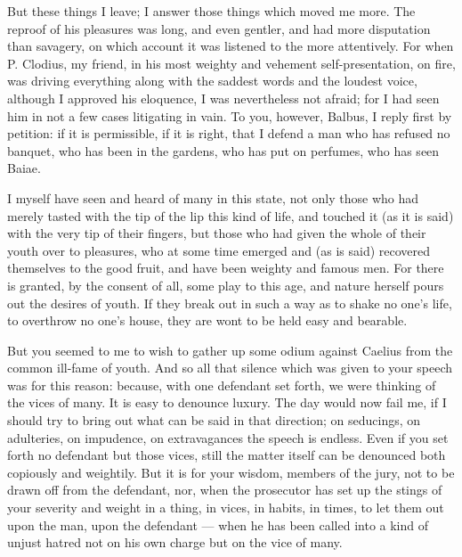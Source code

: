  But these things I leave; I answer those things which moved me more. The reproof of his pleasures was long, and even gentler, and had more disputation than savagery, on which account it was listened to the more attentively. For when P. Clodius, my friend, in his most weighty and vehement self-presentation, on fire, was driving everything along with the saddest words and the loudest voice, although I approved his eloquence, I was nevertheless not afraid; for I had seen him in not a few cases litigating in vain. To you, however, Balbus, I reply first by petition: if it is permissible, if it is right, that I defend a man who has refused no banquet, who has been in the gardens, who has put on perfumes, who has seen Baiae.

 I myself have seen and heard of many in this state, not only those who had merely tasted with the tip of the lip this kind of life, and touched it (as it is said) with the very tip of their fingers, but those who had given the whole of their youth over to pleasures, who at some time emerged and (as is said) recovered themselves to the good fruit, and have been weighty and famous men. For there is granted, by the consent of all, some play to this age, and nature herself pours out the desires of youth. If they break out in such a way as to shake no one's life, to overthrow no one's house, they are wont to be held easy and bearable.

 But you seemed to me to wish to gather up some odium against Caelius from the common ill-fame of youth. And so all that silence which was given to your speech was for this reason: because, with one defendant set forth, we were thinking of the vices of many. It is easy to denounce luxury. The day would now fail me, if I should try to bring out what can be said in that direction; on seducings, on adulteries, on impudence, on extravagances the speech is endless. Even if you set forth no defendant but those vices, still the matter itself can be denounced both copiously and weightily. But it is for your wisdom, members of the jury, not to be drawn off from the defendant, nor, when the prosecutor has set up the stings of your severity and weight in a thing, in vices, in habits, in times, to let them out upon the man, upon the defendant --- when he has been called into a kind of unjust hatred not on his own charge but on the vice of many.

